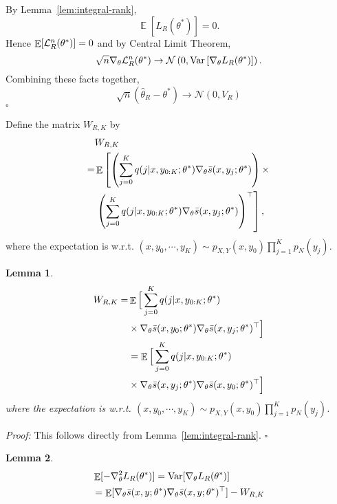 \documentclass[11pt,a4paper]{article}
\newcommand{\qed}{\square}
\DeclareMathOperator{\E}{\mathbb{E}}
\newcommand{\var}{\operatorname{Var}}
\newcommand{\wh}[1]{\widehat{#1}}
\newcommand{\gtheta}{\ensuremath \nabla_{\theta}}
\newcommand{\objr}{{\cal L}_R^n}
\newcommand{\ssf}[3]{\bar{s}(#1, #2; #3)}
\newtheorem{lemma}{Lemma}[section]
\begin{document}
By Lemma~\ref{lem:integral-rank}, 
\[
\E [L_R(\theta^*)] = 0.
\]
Hence $\E [\objr (\theta^*)] = 0$ and by Central Limit Theorem, 
\begin{equation}
    \sqrt{n}\gtheta \objr(\theta^*)\rightarrow \mathcal{N} \left(0, \var \left[\gtheta L_R(\theta^*) \right]\right). 
  \label{eq:asymp-normal-classify}
\end{equation}
Combining these facts together, 
\[
  \sqrt{n}\left(\wh{\theta}_R - \theta^*\right) \rightarrow \mathcal{N}\left(0, V_R \right) 
\]
$\qed$

Define the matrix $W_{R, K}$ by 
\begin{equation*}
\begin{aligned}
& W_{R, K} \\
= & \E \left[ \left(\sum_{j=0}^K q( j | x, y_{0:K}; \theta^*) \gtheta \ssf{x}{y_j}{\theta^*}\right) \times \right. \\
& \left. \left(\sum_{j=0}^K q( j | x, y_{0:K}; \theta^*) \gtheta \ssf{x}{y_j}{\theta^*}\right)^\top\right], 
\end{aligned}
\end{equation*}
where the expectation is w.r.t. $(x, y_0, \cdots, y_K)\sim p_{X, Y}(x, y_0)\prod_{j=1}^K p_N(y_j)$. 

\begin{lemma}
\begin{equation*}
\begin{aligned}
W_{R, K} = & \E \Big[ \sum_{j=0}^K  q( j | x, y_{0:K}; \theta^*)  \\
& \times \gtheta  \ssf{x}{y_0}{\theta^*} \gtheta \ssf{x}{y_j}{\theta^*}^\top\Big] \\
& =  \E \Big[ \sum_{j=0}^K  q( j | x, y_{0:K}; \theta^*) \\ 
& \times \gtheta \ssf{x}{y_j}{\theta^*}\gtheta  \ssf{x}{y_0}{\theta^*}^\top\Big]
\end{aligned}
\end{equation*}
where the expectation is w.r.t. $(x, y_0, \cdots, y_K)\sim p_{X, Y}(x, y_0)\prod_{j=1}^K p_N(y_j)$.
\label{lem:W_k}
\end{lemma}

{\em Proof:}
This follows directly from Lemma~\ref{lem:integral-rank}. $\qed$



\begin{lemma} 
\begin{equation*}
\begin{aligned}
 & \E [-\gtheta^2  L_R(\theta^*)] = \var [\gtheta L_R(\theta^*)] \\
 & =   \E [\gtheta \ssf{x}{y}{\theta^*}\gtheta \ssf{x}{y}{\theta^*}^\top] - W_{R, K}
\end{aligned}
\end{equation*} 
\label{lem:variance-rank}
\end{lemma}
\end{document}
